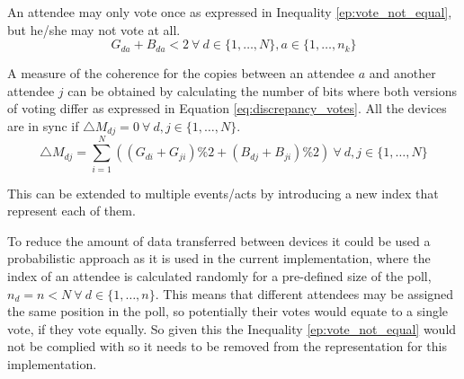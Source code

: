 An attendee may only vote once as expressed in Inequality \ref{ep:vote_not_equal}, but he/she may not vote at all.
\begin{equation} \label{ep:vote_not_equal}
	G_{da} + B_{da} < 2 ~ \forall ~ d \in \{1,\dots, N\}, a \in \{1,\dots, n_{k}\}
\end{equation}

A measure of the coherence for the copies between an attendee $a$ and another attendee $j$ can be obtained by calculating the number of bits where both versions of voting differ as expressed in Equation \ref{eq:discrepancy_votes}. All the devices are in sync if $\bigtriangleup M_{dj} = 0 ~ \forall ~ d, j \in \{1,\dots, N\}$.
\begin{equation} \label{eq:discrepancy_votes}
	\bigtriangleup M_{dj} = \sum^{N}_{i = 1} ((G_{di} + G_{ji}) \% 2 + (B_{dj} + B_{ji}) \% 2) ~ \forall ~ d, j \in \{1,\dots, N\}
\end{equation}

This can be extended to multiple events/acts by introducing a new index that represent each of them.

To reduce the amount of data transferred between devices it could be used a probabilistic approach as it is used in the current implementation, where the index of an attendee is calculated randomly for a pre-defined size of the poll, $n_{d} = n < N ~ \forall ~ d \in \{1,\dots, n\}$. This means that different attendees may be assigned the same position in the poll, so potentially their votes would equate to a single vote, if they vote equally. So given this the Inequality \ref{ep:vote_not_equal} would not be complied with so it needs to be removed from the representation for this implementation.
